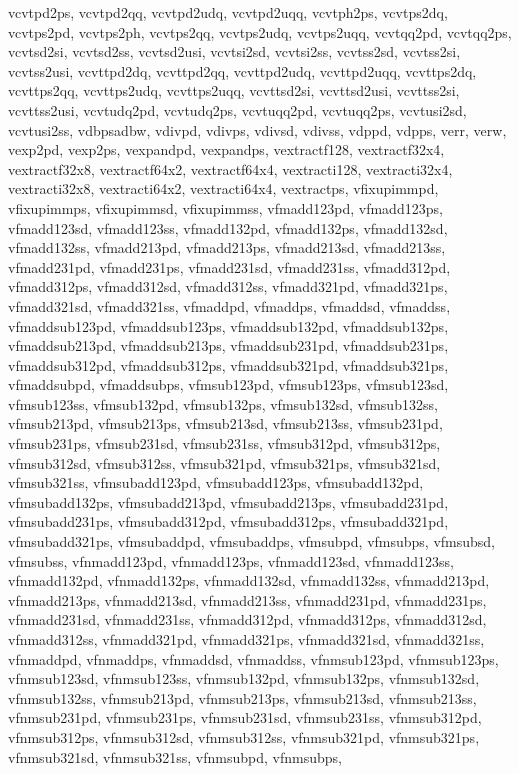 {{vcvtpd2ps, vcvtpd2qq, vcvtpd2udq, vcvtpd2uqq, vcvtph2ps, vcvtps2dq, vcvtps2pd,
vcvtps2ph, vcvtps2qq, vcvtps2udq, vcvtps2uqq, vcvtqq2pd, vcvtqq2ps, vcvtsd2si,
vcvtsd2ss, vcvtsd2usi, vcvtsi2sd, vcvtsi2ss, vcvtss2sd, vcvtss2si, vcvtss2usi,
vcvttpd2dq, vcvttpd2qq, vcvttpd2udq, vcvttpd2uqq, vcvttps2dq, vcvttps2qq,
vcvttps2udq, vcvttps2uqq, vcvttsd2si, vcvttsd2usi, vcvttss2si, vcvttss2usi,
vcvtudq2pd, vcvtudq2ps, vcvtuqq2pd, vcvtuqq2ps, vcvtusi2sd, vcvtusi2ss,
vdbpsadbw, vdivpd, vdivps, vdivsd, vdivss, vdppd, vdpps, verr, verw, vexp2pd,
vexp2ps, vexpandpd, vexpandps, vextractf128, vextractf32x4, vextractf32x8,
vextractf64x2, vextractf64x4, vextracti128, vextracti32x4, vextracti32x8,
vextracti64x2, vextracti64x4, vextractps, vfixupimmpd, vfixupimmps, vfixupimmsd,
vfixupimmss, vfmadd123pd, vfmadd123ps, vfmadd123sd, vfmadd123ss, vfmadd132pd,
vfmadd132ps, vfmadd132sd, vfmadd132ss, vfmadd213pd, vfmadd213ps, vfmadd213sd,
vfmadd213ss, vfmadd231pd, vfmadd231ps, vfmadd231sd, vfmadd231ss, vfmadd312pd,
vfmadd312ps, vfmadd312sd, vfmadd312ss, vfmadd321pd, vfmadd321ps, vfmadd321sd,
vfmadd321ss, vfmaddpd, vfmaddps, vfmaddsd, vfmaddss, vfmaddsub123pd,
vfmaddsub123ps, vfmaddsub132pd, vfmaddsub132ps, vfmaddsub213pd, vfmaddsub213ps,
vfmaddsub231pd, vfmaddsub231ps, vfmaddsub312pd, vfmaddsub312ps, vfmaddsub321pd,
vfmaddsub321ps, vfmaddsubpd, vfmaddsubps, vfmsub123pd, vfmsub123ps, vfmsub123sd,
vfmsub123ss, vfmsub132pd, vfmsub132ps, vfmsub132sd, vfmsub132ss, vfmsub213pd,
vfmsub213ps, vfmsub213sd, vfmsub213ss, vfmsub231pd, vfmsub231ps, vfmsub231sd,
vfmsub231ss, vfmsub312pd, vfmsub312ps, vfmsub312sd, vfmsub312ss, vfmsub321pd,
vfmsub321ps, vfmsub321sd, vfmsub321ss, vfmsubadd123pd, vfmsubadd123ps,
vfmsubadd132pd, vfmsubadd132ps, vfmsubadd213pd, vfmsubadd213ps, vfmsubadd231pd,
vfmsubadd231ps, vfmsubadd312pd, vfmsubadd312ps, vfmsubadd321pd, vfmsubadd321ps,
vfmsubaddpd, vfmsubaddps, vfmsubpd, vfmsubps, vfmsubsd, vfmsubss, vfnmadd123pd,
vfnmadd123ps, vfnmadd123sd, vfnmadd123ss, vfnmadd132pd, vfnmadd132ps,
vfnmadd132sd, vfnmadd132ss, vfnmadd213pd, vfnmadd213ps, vfnmadd213sd,
vfnmadd213ss, vfnmadd231pd, vfnmadd231ps, vfnmadd231sd, vfnmadd231ss,
vfnmadd312pd, vfnmadd312ps, vfnmadd312sd, vfnmadd312ss, vfnmadd321pd,
vfnmadd321ps, vfnmadd321sd, vfnmadd321ss, vfnmaddpd, vfnmaddps, vfnmaddsd,
vfnmaddss, vfnmsub123pd, vfnmsub123ps, vfnmsub123sd, vfnmsub123ss, vfnmsub132pd,
vfnmsub132ps, vfnmsub132sd, vfnmsub132ss, vfnmsub213pd, vfnmsub213ps,
vfnmsub213sd, vfnmsub213ss, vfnmsub231pd, vfnmsub231ps, vfnmsub231sd,
vfnmsub231ss, vfnmsub312pd, vfnmsub312ps, vfnmsub312sd, vfnmsub312ss,
vfnmsub321pd, vfnmsub321ps, vfnmsub321sd, vfnmsub321ss, vfnmsubpd, vfnmsubps,
}}
